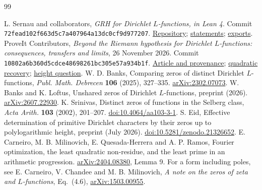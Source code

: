 \documentclass[11pt,letterpaper]{article}
\begin{document}
\begin{thebibliography}{99}\raggedright
{} L. Sernau and collaborators, \emph{GRH for Dirichlet $L$-functions, in Lean 4}. Commit \texttt{72fead102f663d5c7a407964a13dc0cf9d977207}.
\href{https://github.com/lsernau/grh-lean/tree/72fead102f663d5c7a407964a13dc0cf9d977207}{Repository};
\href{https://github.com/lsernau/grh-lean/blob/72fead102f663d5c7a407964a13dc0cf9d977207/grh/src/Statements.lean}{statements};
\href{https://github.com/lsernau/grh-lean/blob/72fead102f663d5c7a407964a13dc0cf9d977207/grh/src/Main.lean}{exports}.
 ProveIt Contributors, \emph{Beyond the Riemann hypothesis for Dirichlet $L$-functions: consequences, transfers and limits}, 26 November 2026. Commit \texttt{10802a6b360d5cdce48698261bc305e57a934b1f}.
\href{https://github.com/VladimirReshetnikov/ProveIt/tree/10802a6b360d5cdce48698261bc305e57a934b1f/Analysis/GeneralizedRiemannHypothesis/Article}{Article and provenance};
\href{https://github.com/VladimirReshetnikov/ProveIt/blob/10802a6b360d5cdce48698261bc305e57a934b1f/Analysis/GeneralizedRiemannHypothesis/Article/sections/rec.tex#L2319-L2354}{quadratic recovery};
\href{https://github.com/VladimirReshetnikov/ProveIt/blob/10802a6b360d5cdce48698261bc305e57a934b1f/Analysis/GeneralizedRiemannHypothesis/Article/sections/rec.tex#L2627-L2633}{height question}.
 W. D. Banks, Comparing zeros of distinct Dirichlet $L$-functions, \emph{Publ. Math. Debrecen} \textbf{106} (2025), 327--335. \href{https://arxiv.org/abs/2302.07073}{arXiv:2302.07073}.
 W. Banks and K. Loftus, Unshared zeros of Dirichlet $L$-functions, preprint (2026). \href{https://arxiv.org/abs/2607.22930}{arXiv:2607.22930}.
 K. Srinivas, Distinct zeros of functions in the Selberg class, \emph{Acta Arith.} \textbf{103} (2002), 201--207. \href{https://doi.org/10.4064/aa103-3-1}{doi:10.4064/aa103-3-1}.
 S. Eid, Effective determination of primitive Dirichlet characters by their zeros up to polylogarithmic height, preprint (July 2026). \href{https://doi.org/10.5281/zenodo.21326652}{doi:10.5281/zenodo.21326652}.
 E. Carneiro, M. B. Milinovich, E. Quesada-Herrera and A. P. Ramos, Fourier optimization, the least quadratic non-residue, and the least prime in an arithmetic progression. \href{https://arxiv.org/abs/2404.08380}{arXiv:2404.08380}, Lemma 9. For a form including poles, see E. Carneiro, V. Chandee and M. B. Milinovich, \emph{A note on the zeros of zeta and $L$-functions}, Eq.~(4.6), \href{https://arxiv.org/abs/1503.00955}{arXiv:1503.00955}.

\end{thebibliography}
\end{document}
